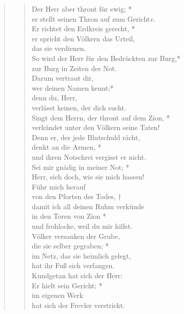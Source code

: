 


\begin{quote}
\begin{verse}


\smallskip
Der Herr aber thront für ewig; *\\
er stellt seinen Thron auf zum Gericht\textit{e}.\\
\vin Er richtet den Erdkreis gerecht, *\\
\vin er spricht den Völkern das Urteil,\\
\vin das sie verdienen.\\
So wird der Herr für den Bedrückten zur Burg,*\\
zur Burg in Zeiten der Not.\\
\vin Darum vertraut dir,\\ 
\vin wer deinen Namen kennt;*\\
\vin denn du, Herr,\\ 
\vin verlässt keinen, der dich sucht.\\
Singt dem Herrn, der thront auf dem Zion, *\\
verkündet unter den Völkern seine Taten!\\
\vin Denn er, der jede Blutschuld rächt,\\ 
\vin denkt an die Armen, *\\
\vin und ihren Notschrei vergisst er nicht.\\
Sei mir gnädig in meiner Not; *\\
Herr, sieh doch, wie sie mich hassen!\\
\vin Führ mich herauf\\ 
\vin von den Pforten des Todes, †\\
\vin damit ich all deinen Ruhm verkünde\\ 
\vin in den Toren von Zion *\\
\vin und frohlocke, weil du mir hilfst.\\
Völker versanken der Grube,\\
die sie selber gegraben; *\\
im Netz, das sie heimlich gelegt,\\
hat ihr Fuß sich verfangen.\\
\vin Kundgetan hat sich der Herr: \\ 
\vin Er hielt sein Gericht; *\\
\vin im eigenen Werk\\ 
\vin hat sich der Frevler verstrickt.\\

\end{verse}
\end{quote}
